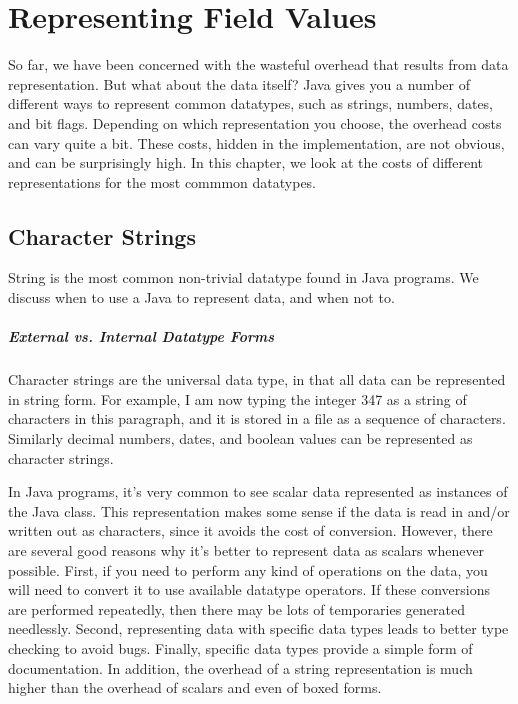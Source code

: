 \chapter{Representing Field Values}
\label{chapter:representing-values}

So far, we have been concerned with the wasteful overhead that results from
data representation. But what about the data itself?
Java gives you a number of different ways to represent common datatypes, such
as strings, numbers, dates, and bit flags. Depending on which
representation you choose, the overhead costs can vary quite a bit. 
These costs, hidden in the implementation, are not obvious, and can be
surprisingly high.
In this chapter, we look at the costs of different representations for the most 
commmon datatypes.

\section{Character Strings}
String is the most common non-trivial datatype found in Java programs. We
discuss when to use a Java  to represent data, and when not to.
\paragraph{External vs. Internal Datatype Forms}
Character strings are the universal data type, in that all data can be
represented in string form.  For example, I am now typing the integer 347 as a
string of characters in this paragraph, and it is stored in a file as a sequence
of characters. Similarly decimal numbers, dates, and boolean values can be
represented as character strings.
 
In Java programs, it's very common to see scalar data represented as instances
of the Java  class. This representation makes some sense if the
data is read in and/or written out as characters, since it avoids the
cost of conversion. However, there are several good reasons why it's better
to represent data as scalars whenever possible. First, if you need to perform
any kind of operations on the data, you will need to convert it to use
available datatype operators. If these conversions are performed
repeatedly, then there may be lots of temporaries generated needlessly.  Second,
representing data with specific data types leads to better type checking to avoid bugs. 
Finally, specific data types provide a simple form of documentation.
In addition, the overhead of a string representation is much higher than
the overhead of scalars and even of boxed forms.

